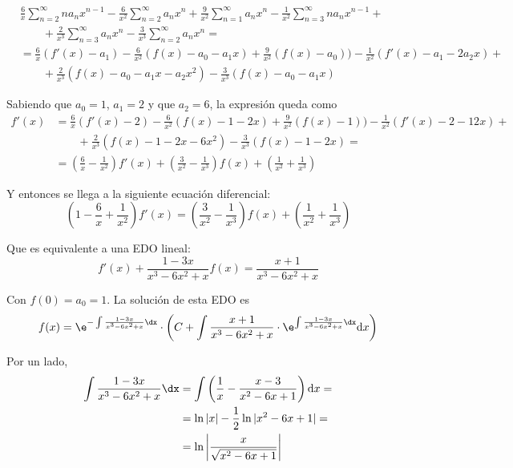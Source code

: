 \documentclass[../../main.tex]{subfiles}
\begin{document}
  \begin{equation*}
    \begin{split}
      &
      \frac{6}{x}\sum_{n = 2}^\infty n a_n x^{n - 1} - \frac{6}{x^2}\sum_{n = 2}^\infty a_n x^n + \frac{9}{x^2} \sum_{n = 1}^\infty a_n x^n - \frac{1}{x^2} \sum_{n = 3}^\infty n a_n x^{n - 1} + \\ & \qquad + \frac{2}{x^3} \sum_{n = 3}^\infty  a_n x^n - \frac{3}{x^3} \sum_{n = 2}^\infty a_n x^n = \\ & =
      \frac{6}{x} (f'(x) - a_1) - \frac{6}{x^2} (f(x) - a_0 - a_1 x) + \frac{9}{x^2} (f(x) - a_0)) - \frac{1}{x^2} (f'(x) - a_1 - 2 a_2 x) + \\ & \qquad + \frac{2}{x^3} (f(x) - a_0 - a_1 x - a_2 x^2) - \frac{3}{x^3} (f(x) - a_0 - a_1 x)
    \end{split}
  \end{equation*}

  Sabiendo que $a_0 = 1$, $a_1 = 2$ y que $a_2 = 6$, la expresión queda como
  \begin{equation*}
    \begin{split}
      f'(x) & =
      \frac{6}{x} (f'(x) - 2) - \frac{6}{x^2} (f(x) - 1 - 2 x) + \frac{9}{x^2} (f(x) - 1)) - \frac{1}{x^2} (f'(x) - 2 - 12 x) + \\ & \qquad + \frac{2}{x^3} (f(x) - 1 - 2 x - 6 x^2) - \frac{3}{x^3} (f(x) - 1 - 2 x) = \\ & =
      \left(\frac{6}{x} - \frac{1}{x^2}\right) f'(x) + \left(\frac{3}{x^2} - \frac{1}{x^3}\right) f(x) + \left(\frac{1}{x^2} + \frac{1}{x^3}\right)
    \end{split}
  \end{equation*}

  Y entonces se llega a la siguiente ecuación diferencial:
  $$
  \left(1 - \frac{6}{x} + \frac{1}{x^2}\right) f'(x) = \left(\frac{3}{x^2} - \frac{1}{x^3}\right) f(x) + \left(\frac{1}{x^2} + \frac{1}{x^3}\right)
  $$

  Que es equivalente a una EDO lineal:
  $$
  f'(x) + \frac{1 - 3x}{x^3 - 6 x^2 + x} f(x) = \frac{x + 1}{x^3 - 6 x^2 + x}
  $$

  Con $f(0) = a_0 = 1$. La solución de esta EDO es
  $$
  f(x) = \e^{- \int \frac{1 - 3x}{x^3 - 6 x^2 + x} \dx} \cdot \left(C + \int \frac{x + 1}{x^3 - 6 x^2 + x} \cdot \e^{\int \frac{1 - 3x}{x^3 - 6 x^2 +x} \dx} \text{d}x\right)
  $$

  Por un lado,
  \begin{equation*}
    \begin{split}
      \int \frac{1 - 3x}{x^3 - 6 x^2 + x} \dx & =
      \int \left(\frac{1}{x} - \frac{x - 3}{x^2 - 6x + 1}\right) \text{d}x = \\ & =
      \ln{|x|} - \frac{1}{2} \ln{|x^2 - 6x + 1|} = \\ & =
      \ln{\left|\frac{x}{\sqrt{x^2 - 6x + 1}}\right|}
    \end{split}
  \end{equation*}
\end{document}
